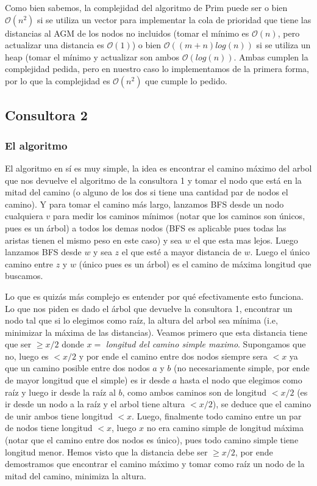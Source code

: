 \documentclass[A4paper,oneside,fleqn,11pt]{article}
\theoremstyle{definition}
\begin{document}
Como bien sabemos, la complejidad del algoritmo de Prim puede ser o bien $\mathcal{O} (n^2)$ si se utiliza un vector para implementar la cola de prioridad que tiene las distancias al AGM de los nodos no incluidos (tomar el mínimo es $\mathcal{O} (n)$, pero actualizar una distancia es $\mathcal{O} (1)$) o bien $\mathcal{O} ((m+n) log(n))$ si se utiliza un heap (tomar el mínimo y actualizar son ambos $\mathcal{O} (log(n))$. Ambas cumplen la complejidad pedida, pero en nuestro caso lo implementamos de la primera forma, por lo que la complejidad es $\mathcal{O} (n^2)$ que cumple lo pedido.

\subsection{Consultora 2}


\subsubsection{El algoritmo}
El algoritmo en sí es muy simple, la idea es encontrar el camino máximo del arbol que nos devuelve el algoritmo de la consultora 1 y tomar el nodo que está en la mitad del camino (o alguno de los dos si tiene una cantidad par de nodos el camino). Y para tomar el camino más largo, lanzamos BFS desde un nodo cualquiera $v$ para medir los caminos mínimos (notar que los caminos son únicos, pues es un árbol) a todos los demas nodos (BFS es aplicable pues todas las aristas tienen el mismo peso en este caso) y sea $w$ el que esta mas lejos. Luego lanzamos BFS desde $w$ y sea $z$ el que esté a mayor distancia de $w$. Luego el único camino entre $z$ y $w$ (único pues es un árbol) es el camino de máxima longitud que buscamos.

Lo que es quizás más complejo es entender por qué efectivamente esto funciona. Lo que nos piden es dado el árbol que devuelve la consultora 1, encontrar un nodo tal que si lo elegimos como raíz, la altura del arbol sea mínima (i.e, minimizar la máxima de las distancias). Veamos primero que esta distancia tiene que ser $\geq x/2$ donde $x =$ \textit{longitud del camino simple maximo}. Supongamos que no, luego es $<x/2$ y por ende el camino entre dos nodos siempre sera $<x$ ya que un camino posible entre dos nodos $a$ y $b$ (no necesariamente simple, por ende de mayor longitud que el simple) es ir desde $a$ hasta el nodo que elegimos como raíz y luego ir desde la raíz al $b$, como ambos caminos son de longitud $<x/2$ (es ir desde un nodo a la raíz y el arbol tiene altura $<x/2$), se deduce que el camino de unir ambos tiene longitud $<x$. Luego, finalmente todo camino entre un par de nodos tiene longitud $<x$, luego $x$ no era camino simple de longitud máxima (notar que el camino entre dos nodos es único), pues todo camino simple tiene longitud menor. Hemos visto que la distancia debe ser $\geq x/2$, por ende demostramos que encontrar el camino máximo y tomar como raíz un nodo de la mitad del camino, minimiza la altura.
\end{document}
